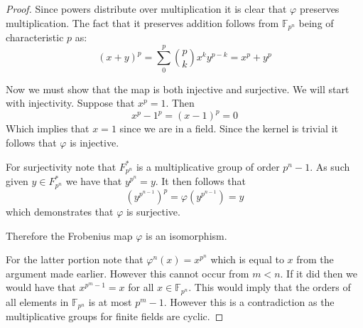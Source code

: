 \documentclass[10pt]{article}
\newcommand{\sk}{\vskip 10mm}
\newcommand{\bb}[1]{\mathbb{#1}}
\theoremstyle{remark}
\theoremstyle{remark}
\begin{document}
\begin{proof}
  Since powers distribute over multiplication it is clear that
  $\varphi$ preserves multiplication. The fact that it preserves addition
  follows from $\bb{F}_{p^n}$ being of characteristic $p$ as:
  \[(x+y)^p=\sum_0^p{p\choose k}x^ky^{p-k}=x^p+y^p \]

  Now we must show that the map is both injective and surjective.
  We will start with injectivity. Suppose that $x^p=1$. Then
  \[x^p-1^p=(x-1)^p=0 \]
  Which implies that $x=1$ since we are in a field. Since the
  kernel is trivial it follows that $\varphi$ is injective.

  For surjectivity note that $F_{p^n}^*$ is a multiplicative
  group of order $p^n-1$. As such given $y\in F_{p^n}^*$ we have
  that $y^{p^n}=y$. It then follows that
  \[\left(y^{p^{n-1}}\right)^p=\varphi\left(y^{p^{n-1}}\right)=y\]
  which demonstrates that $\varphi$ is surjective.

  Therefore the Frobenius map $\varphi$ is an isomorphism.

  \sk

  For the latter portion note that $\varphi^n(x)=x^{p^n}$ which
  is equal to $x$ from the argument made earlier. However
  this cannot occur from $m<n$. If it did then we would have
  that $x^{p^m-1}=x$ for all $x\in\bb{F}_{p^n}$. This would imply that
  the orders of all elements in $\bb{F}_{p^n}$ is at most $p^m-1$.
  However this is a contradiction as the multiplicative groups for
  finite fields are cyclic.
\end{proof}

\sk
\end{document}
